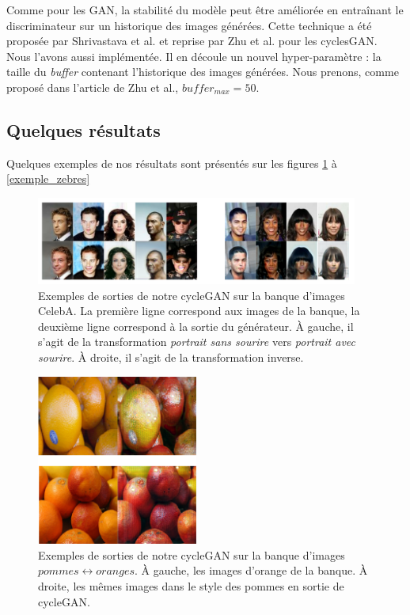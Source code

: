 Comme pour les GAN, la stabilité du modèle peut être améliorée en entraînant le discriminateur sur un historique des images générées. Cette technique a été proposée par Shrivastava  et  al. \cite{shrivastava_learning_2016} et reprise par Zhu et al. pour les cyclesGAN. Nous l'avons aussi implémentée. Il en découle un nouvel hyper-paramètre : la taille du \textit{buffer} contenant l'historique des images générées. Nous prenons, comme proposé dans l'article de Zhu et al., $buffer_{max} = 50$.

\subsection{Quelques résultats}

Quelques exemples de nos résultats sont présentés sur les figures \ref{exemple_celebA} à \ref{exemple_zebres}

\begin{figure}[!h]
\centering
\includegraphics[width=300pt]{"images/cycle/cycle"}
\caption{Exemples de sorties de notre cycleGAN sur la banque d'images CelebA. La première ligne correspond aux images de la banque, la deuxième ligne correspond à la sortie du générateur. À gauche, il s'agit de la transformation \textit{portrait sans sourire} vers \textit{portrait avec sourire}. À droite, il s'agit de la transformation inverse.}
\label{exemple_celebA}
\end{figure}

\begin{figure}[!h]
\centering
\includegraphics[width=150pt]{"images/cycle/cycleRes2"}
\caption{Exemples de sorties de notre cycleGAN sur la banque d'images $pommes \leftrightarrow oranges$. À gauche, les images d'orange de la banque. À droite, les mêmes images dans le style des pommes en sortie de cycleGAN.}
\label{exemple_orange}
\end{figure}

